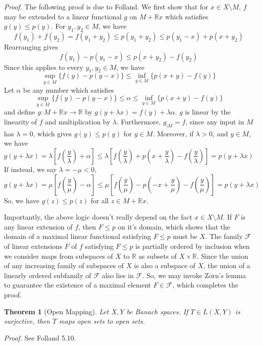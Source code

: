 \documentclass[letterpaper,10pt]{article}
\theoremstyle{definition}
\theoremstyle{remark}
\theoremstyle{plain}
\newtheorem{thm}{Theorem}[section]
\renewenvironment{proof}{
    \vspace{5pt}
    \begin{mdframed}[bottomline=false,topline=false,rightline=false, skipabove=0]
    \noindent\textit{Proof.}}
{
    \hspace{\fill}\qedsymbol
    \end{mdframed}
}
\begin{document}
\begin{proof}
    The following proof is due to Folland. %
    We first show that for $x\in X\setminus M$, $f$ may be extended to a linear functional
    $g$ on $M+\mathbb Rx$ which satisfies $g(y)\leq p(y)$.
    For $y_1,y_2\in M$, we have 
    $$
    f(y_1)+f(y_2)=f(y_1+y_2)\leq p(y_1+y_2)\leq p(y_1-x)+p(x+y_2)
    $$
    Rearranging gives
    $$
    f(y_1)-p(y_1-x)\leq p(x+y_2)-f(y_2)
    $$
    Since this applies to every $y_1,y_2\in M$, we have
    $$
    \sup_{y\in M}\{f(y)-p(y-x)\}\leq\inf_{y\in M}\{p(x+y)-f(y)\}
    $$
    Let $\alpha$ be any number which satisfies
    $$
    \sup_{y\in M}\{f(y)-p(y-x)\}\leq\alpha\leq\inf_{y\in M}\{p(x+y)-f(y)\}
    $$
    and define $g:M+\mathbb Rx\rightarrow\mathbb R$ by $g(y+\lambda x)=f(y)+\lambda\alpha$.
    $g$ is linear by the linearity of $f$ and multiplication by $\lambda$. Furthermore,
    $g_{|M}=f$, since any input in $M$ has $\lambda=0$, which gives $g(y)\leq p(y)$ for $y\in M$.
    Moreover, if $\lambda>0$, and $y\in M$, we have
    $$
    g(y+\lambda x)
    =
    \lambda\left[f\left(\frac{y}{\lambda}\right)+\alpha\right]
    \leq
    \lambda\left[f\left(\frac{y}{\lambda}\right)+p\left(x+\frac{y}{\lambda}\right)-f\left(\frac{y}{\lambda}\right)\right]
    =
    p(y+\lambda x)
    $$
    If instead, we say $\lambda=-\mu<0$,
    $$
    g(y+\lambda x)
    =
    \mu\left[f\left(\frac{y}{\mu}\right)-\alpha\right]
    \leq
    \mu\left[f\left(\frac{y}{\mu}\right)-p\left(-x+\frac{y}{\mu}\right)-f\left(\frac{y}{\mu}\right)\right]
    =
    p(y+\lambda x)
    $$
    So, we have $g(z)\leq p(z)$ for all $z\in M+\mathbb Rx$.

    Importantly, the above logic doesn't really depend on the fact $x\in X\setminus M$.
    If $F$ is any linear extension of $f$, then $F\leq p$ on it's domain, which shows
    that the domain of a maximal linear functional satisfying $F\leq p$ must be $X$.
    The family $\mathcal F$ of linear extensions $F$ of $f$ satisfying $F\leq p$
    is partially ordered by inclusion when we consider maps from subspaces of $X$ to 
    $\mathbb R$ as subsets of $X\times\mathbb R$.
    Since the union of any increasing family of subspaces of $X$ is also a subspace of 
    $X$, the union of a linearly ordered subfamily of $\mathcal F$ also lies in $\mathcal F$.
    So, we may invoke Zorn's lemma to guarantee the existence of a maximal 
    element $F\in\mathcal F$, which completes the proof.
\end{proof}
\begin{thm}[Open Mapping]\label{thm:openmap}
    Let $X,Y$ be Banach spaces. If $T\in L(X,Y)$ is surjective, then $T$ maps open sets
    to open sets.
\end{thm}
\begin{proof}
    See Folland 5.10. %
\end{proof}
\end{document}
